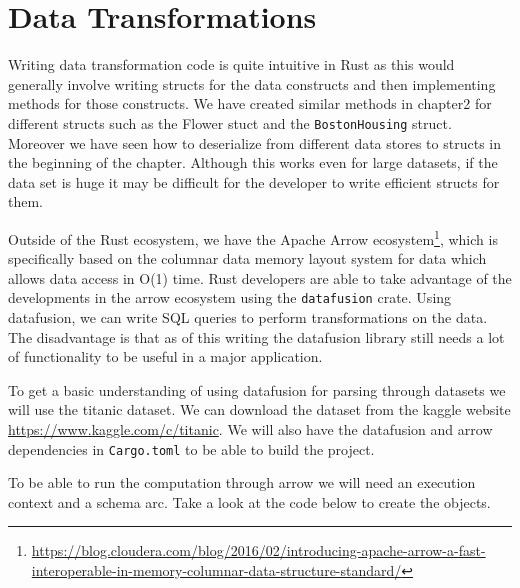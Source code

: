 \documentclass{book}
\begin{document}
\label{sec:storing_data_on_s3}

\section{Data Transformations}%
Writing data transformation code is quite intuitive in Rust as this would generally involve writing structs for the data constructs and then implementing methods for those constructs. We have created similar methods in chapter2 for different structs such as the Flower stuct and the \lstinline{BostonHousing} struct. Moreover we have seen how to deserialize from different data stores to structs in the beginning of the chapter. Although this works even for large datasets, if the data set is huge it may be difficult for the developer to write efficient structs for them.

Outside of the Rust ecosystem, we have the Apache Arrow ecosystem\footnote{\href{}{https://blog.cloudera.com/blog/2016/02/introducing-apache-arrow-a-fast-interoperable-in-memory-columnar-data-structure-standard/}}, which is specifically based on the columnar data memory layout system for data which allows data access in O(1) time. Rust developers are able to take advantage of the developments in the arrow ecosystem using the \lstinline{datafusion} crate. Using datafusion, we can write SQL queries to perform transformations on the data. The disadvantage is that as of this writing the datafusion library still needs a lot of functionality to be useful in a major application.

To get a basic understanding of using datafusion for parsing through datasets we will use the titanic dataset. We can download the dataset from the kaggle website \href{}{https://www.kaggle.com/c/titanic}. We will also have the datafusion and arrow dependencies in \lstinline{Cargo.toml} to be able to build the project.

To be able to run the computation through arrow we will need an execution context and a schema arc. Take a look at the code below to create the objects.
\end{document}
